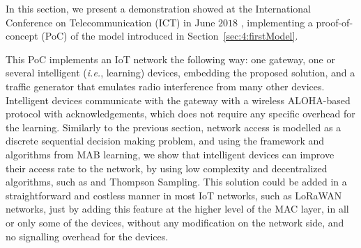 

\graphicspath{{2-Chapters/4-Chapter/IEEE_WCNC_2019__DemoICT.git/pictures/}}

In this section, we present a demonstration showed at the International Conference on Telecommunication (ICT) in June $2018$ \cite{Besson2018ICT,Besson2019WCNC}, implementing a proof-of-concept (PoC) of the model introduced in Section~\ref{sec:4:firstModel}.

This PoC implements an IoT network the following way: one gateway, one or several intelligent (\emph{i.e.}, learning) devices, embedding the proposed solution,
and a traffic generator that emulates radio interference from many other devices.
Intelligent devices communicate with the gateway with a wireless ALOHA-based protocol with acknowledgements, which does not require any specific overhead for the learning.
%
Similarly to the previous section, network access is modelled as a discrete sequential decision making problem, and using the framework and algorithms from MAB learning, we show that intelligent devices can improve their access rate to the network, by using low complexity and decentralized algorithms, such as \UCB{} and Thompson Sampling.
%
This solution could be added in a straightforward and costless manner in most IoT networks, such as LoRaWAN networks, just by adding this feature at the higher level of the MAC layer, in all or only some of the devices, without any modification on the network side, and no signalling overhead for the devices.

